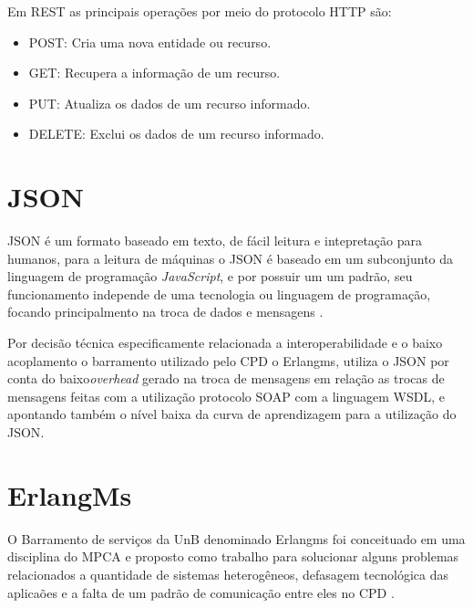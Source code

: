 Em \acrshort{REST} as principais operações por meio do protocolo \acrshort{HTTP} são:

\begin{itemize}

\item POST: Cria uma nova entidade ou recurso. 

\item GET: Recupera a informação de um recurso.

\item PUT: Atualiza os dados de um recurso informado.

\item DELETE: Exclui os dados de um recurso informado.

\end{itemize}


\section{JSON}

\acrfull{JSON} é um formato baseado em texto, de fácil leitura e intepretação para humanos, para a leitura de máquinas o \acrshort{JSON} é baseado em um subconjunto da linguagem de programação \textit{JavaScript}, e por possuir um um padrão, seu funcionamento independe de uma tecnologia ou linguagem de programação, focando principalmento na troca de dados e mensagens \cite{bray2017javascript}.

Por decisão técnica especificamente relacionada a interoperabilidade e o baixo acoplamento o barramento utilizado pelo \acrshort{CPD} o Erlangms, utiliza o \acrshort{JSON} por conta do  baixo\textit{overhead} gerado na troca de mensagens em relação as trocas de mensagens feitas com a utilização protocolo \acrshort{SOAP} com a linguagem \acrshort{WSDL}, e apontando também o nível baixa da curva de aprendizagem para a utilização do \acrshort{JSON}.


\section{ErlangMs}
O Barramento de serviços da \acrshort{UnB} denominado Erlangms foi conceituado em uma disciplina do \acrshort{MPCA} e proposto como trabalho para solucionar alguns problemas relacionados a quantidade de sistemas heterogêneos, defasagem tecnológica das aplicaões e a falta de um padrão de comunicação entre eles no \acrshort{CPD} \cite{Agilar}. 


